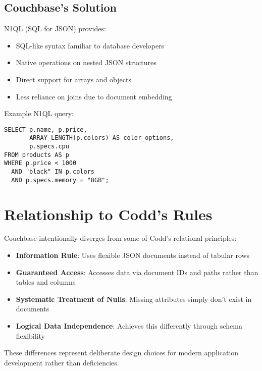 \subsection{Couchbase's Solution}
N1QL (SQL for JSON) provides:
\begin{itemize}
  \item SQL-like syntax familiar to database developers
  \item Native operations on nested JSON structures
  \item Direct support for arrays and objects
  \item Less reliance on joins due to document embedding
\end{itemize}

Example N1QL query:
\begin{verbatim}
SELECT p.name, p.price, 
       ARRAY_LENGTH(p.colors) AS color_options,
       p.specs.cpu
FROM products AS p
WHERE p.price < 1000
  AND "black" IN p.colors
  AND p.specs.memory = "8GB";
\end{verbatim}

\section{Relationship to Codd's Rules}

Couchbase intentionally diverges from some of Codd's relational principles:

\begin{itemize}
  \item \textbf{Information Rule}: Uses flexible JSON documents instead of tabular rows
  \item \textbf{Guaranteed Access}: Accesses data via document IDs and paths rather than tables and columns
  \item \textbf{Systematic Treatment of Nulls}: Missing attributes simply don't exist in documents
  \item \textbf{Logical Data Independence}: Achieves this differently through schema flexibility
\end{itemize}

These differences represent deliberate design choices for modern application development rather than deficiencies.

